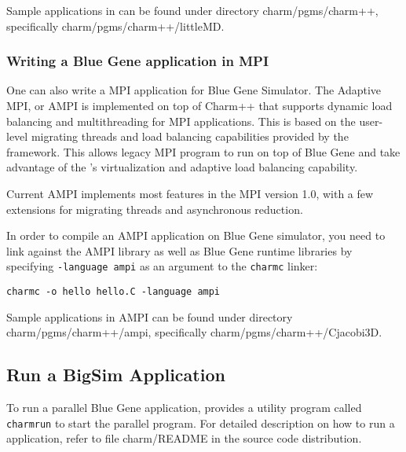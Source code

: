 Sample applications in \charmpp{} can be found under directory
charm/pgms/charm++, specifically charm/pgms/charm++/littleMD.

\subsubsection{Writing a Blue Gene application in MPI}

One can also write a MPI application for Blue Gene Simulator.
The Adaptive MPI, or AMPI is implemented on top of Charm++ that supports
dynamic load balancing and multithreading for MPI applications. This is based
on the user-level migrating threads and load balancing capabilities provided
by the \charmpp{} framework. This allows legacy MPI program to run 
on top of Blue Gene \charmpp{} and take advantage of the \charmpp{}'s
virtualization and adaptive load balancing capability.

Current AMPI implements most features in the MPI version 1.0, with a few
extensions for migrating threads and asynchronous reduction.

In order to compile an AMPI application on Blue Gene simulator, you need 
to link against the AMPI library as well as Blue Gene \charmpp{} runtime
libraries by specifying \texttt{-language ampi} as an argument to 
the {\tt charmc} linker:
\begin{verbatim}
charmc -o hello hello.C -language ampi
\end{verbatim}

Sample applications in AMPI can be found under directory
charm/pgms/charm++/ampi, specifically charm/pgms/charm++/Cjacobi3D.

\subsection{Run a BigSim Application}

To run a parallel Blue Gene application, \charmpp{} provides a utility program
called {\tt charmrun} to start the parallel program. 
For detailed description on how to run a \charmpp{} application, 
refer to file charm/README in the source code distribution.

